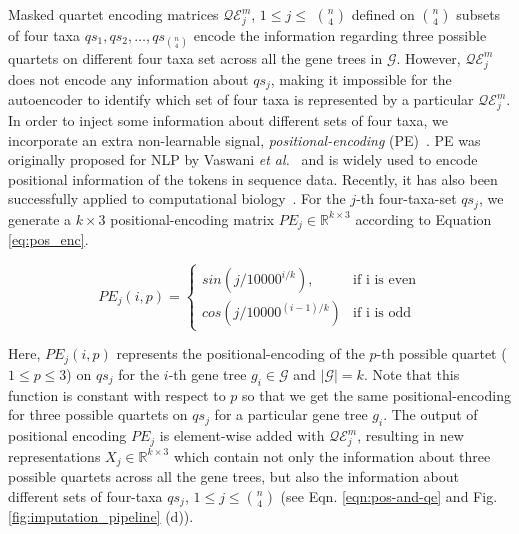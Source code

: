 Masked quartet encoding matrices $\mathcal{QE}_j^m$, $1 \le j \le$ $n\choose4$ defined on $n\choose4$ subsets of four taxa $qs_1, qs_2, \ldots, qs_{n\choose4}$ encode the information regarding three possible quartets on different four taxa set across all the gene trees in $\mathcal{G}$. However, $\mathcal{QE}_j^m$ does not encode any information about $qs_j$, making it impossible for the autoencoder to identify which set of four taxa is represented by a particular $\mathcal{QE}_j^m$.
In order to inject some information about different sets of four taxa, we incorporate an extra non-learnable signal, \textit{positional-encoding} (PE)~\cite{Transformer}. PE was originally proposed for NLP by Vaswani \textit{et al.}~\cite{Transformer} and is widely used to encode positional information of the tokens in sequence data. Recently, it has also been successfully applied to computational biology~\cite{SAINT}. For the $j$-th four-taxa-set $qs_j$, we generate a $k \times 3$ positional-encoding matrix $PE_j \in \mathbb{R}^{k \times 3}$ according to Equation \ref{eq:pos_enc}.

\vspace{-5pt}
\begin{equation}
\label{eq:pos_enc}
    PE_j(i, p) = \begin{cases} 
        sin{(j/{10000^{i/k}})}, & \mbox{if i is even} \\ 
        cos{(j/{10000^{(i-1)/k}})} & \mbox{if i is odd}   
    \end{cases} 
\end{equation}


Here, $PE_j(i, p)$ represents the positional-encoding of the $p$-th possible quartet ($1 \le p \le 3$) on $qs_j$ for the $i$-th gene tree $g_i \in \mathcal{G}$ and $|\mathcal{G}| = k$. Note that this function is constant with respect to $p$ 
so that we get the same positional-encoding for three possible quartets on $qs_j$ for a particular gene tree $g_i$. 
The output of positional encoding $PE_j$
is element-wise added with $\mathcal{QE}_j^m$, resulting in new representations $X_j \in \mathbb{R}^{k \times 3}$
which contain not only the information about three possible quartets across all the gene trees, but also the information about different sets of four-taxa $qs_j$, $1 \le j \le $$n\choose 4$ (see Eqn. \ref{eqn:pos-and-qe} and Fig. \ref{fig:imputation_pipeline} (d)).

